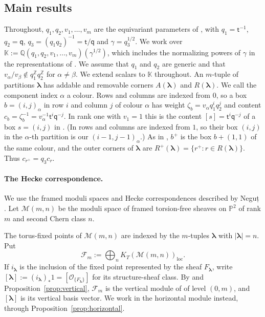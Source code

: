 \documentclass[11pt]{amsart}
\theoremstyle{definition}
\theoremstyle{remark}
\newcommand{\Mq}{\mathsf q}                      %
\newcommand{\Mt}{\mathsf t}                      %
\newcommand{\K}{\mathbb K}                       %
\newcommand{\bl}{{\boldsymbol{\lambda}}}         %
\newcommand{\Add}[1]{A(#1)}                      %
\newcommand{\Rem}[1]{R(#1)}                      %
\newcommand{\bwt}[1]{\zeta_{#1}}                 %
\newcommand{\ceig}[1]{c_{#1}}                    %
\newcommand{\bplus}[1]{{#1}^{+}}                 %
\newcommand{\Remp}[1]{R^{+}(#1)}                 %
\newcommand{\bx}[3]{(#1,#2)_{#3}}                %
\newcommand{\Ptwo}{\mathbb P^2}
\newcommand{\Kloc}[1]{K_T(#1)_{\mathrm{loc}}}    %
\newcommand{\Gies}[2]{\mathcal M(#1,#2)}         %
\newcommand{\Fock}[1]{\mathcal F_{#1}}            %
\newcommand{\Sh}{F}                              %
\newcommand{\Fsh}[1]{\Sh_{#1}}                   %
\newcommand{\fix}[1]{[#1]}                       %
\newcommand{\Negut}{Neguț}
\begin{document}
\subsection{Main results}\label{sec:mainresults}

Throughout, \(q_1,q_2,v_1,\dots,v_m\) are the equivariant parameters of
\cite{BCS}, with \(q_1=\Mt^{-1}\), \(q_2=\Mq\), \(q_3=(q_1q_2)^{-1}=\Mt/\Mq\)
and \(\gamma=q_3^{1/2}\). We work over
\(\K:=\mathbb Q(q_1,q_2,v_1,\dots,v_m)(\gamma^{1/2})\), which includes the
normalizing powers of \(\gamma\) in the representations of \cite{BCS}.
We assume that \(q_1\) and \(q_2\) are generic and that
\(v_\alpha/v_\beta\notin q_1^{\mathbb Z}q_2^{\mathbb Z}\) for \(\alpha\neq\beta\).
We extend scalars to \(\K\) throughout.
An \(m\)-tuple of partitions \(\bl\) has addable and removable corners
\(\Add{\bl}\) and \(\Rem{\bl}\). We call the component index \(\alpha\) a colour.
Rows and columns are indexed from \(0\), so a
box \(b=\bx{i}{j}{\alpha}\) in row \(i\) and column \(j\) of colour \(\alpha\) has
weight \(\bwt{b}=v_\alpha q_1^{i}q_2^{j}\) and content
\(\ceig{b}=\bwt{b}^{-1}=v_\alpha^{-1}\Mt^i\Mq^{-j}\). In rank one with \(v_1=1\)
this is the content \([s]=\Mt^i\Mq^{-j}\) of a box \(s=(i,j)\) in \cite{M26}.
(In \cite{BCS} rows and columns are indexed from \(1\), so their box \((i,j)\) in the \(\alpha\)-th partition
is our \(\bx{i-1}{j-1}{\alpha}\).) As in \cite{M26}, \(\bplus{b}\) is the box
\(b+(1,1)\) of the same colour, and the outer corners of \(\bl\) are
\(\Remp{\bl}=\{\bplus{r}:r\in\Rem{\bl}\}\). Thus \(\ceig{\bplus{r}}=q_3\ceig{r}\).


\paragraph{The Hecke correspondence.}
We use the framed moduli spaces and Hecke correspondences described by
\Negut{} \cite[Sections~2 and~3.1]{N1}. Let \(\Gies{m}{n}\) be the moduli space of framed
torsion-free sheaves on \(\Ptwo\) of rank \(m\) and second Chern class \(n\).

The torus-fixed points of \(\Gies{m}{n}\) are indexed by the \(m\)-tuples \(\bl\) with \(|\bl|=n\). Put
\[
 \Fock{m}:=\bigoplus_n\Kloc{\Gies{m}{n}}.
\]
If \(i_\bl\) is the inclusion of the fixed
point represented by the sheaf \(\Fsh{\bl}\), write
\(\fix{\bl}:=(i_\bl)_*1=[\mathcal O_{\{\Fsh{\bl}\}}]\) for its structure-sheaf class.
By \cite{N1,BCS} and Proposition~\ref{prop:vertical},
\(\Fock{m}\) is the vertical module of \cite{BCS} of level \((0,m)\), and
\(\fix{\bl}\) is its vertical basis vector. We work in the horizontal module
instead, through Proposition~\ref{prop:horizontal}.
\end{document}
